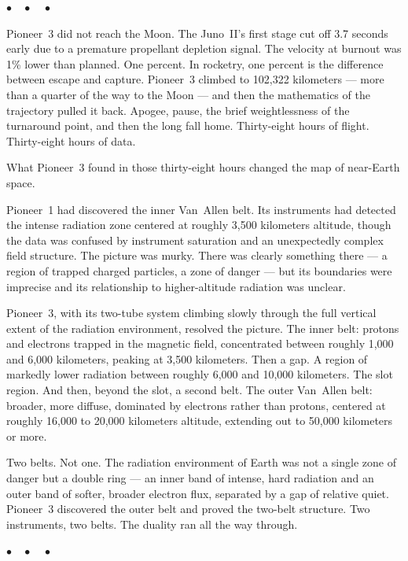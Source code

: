 \documentclass[12pt, letterpaper]{article}
\begin{document}
\begin{center}
$\bullet\quad\bullet\quad\bullet$
\end{center}

Pioneer~3 did not reach the Moon. The Juno~II's first stage cut off 3.7 seconds early due to a premature propellant depletion signal. The velocity at burnout was 1\% lower than planned. One percent. In rocketry, one percent is the difference between escape and capture. Pioneer~3 climbed to 102,322 kilometers --- more than a quarter of the way to the Moon --- and then the mathematics of the trajectory pulled it back. Apogee, pause, the brief weightlessness of the turnaround point, and then the long fall home. Thirty-eight hours of flight. Thirty-eight hours of data.

What Pioneer~3 found in those thirty-eight hours changed the map of near-Earth space.

Pioneer~1 had discovered the inner Van~Allen belt. Its instruments had detected the intense radiation zone centered at roughly 3,500 kilometers altitude, though the data was confused by instrument saturation and an unexpectedly complex field structure. The picture was murky. There was clearly something there --- a region of trapped charged particles, a zone of danger --- but its boundaries were imprecise and its relationship to higher-altitude radiation was unclear.

Pioneer~3, with its two-tube system climbing slowly through the full vertical extent of the radiation environment, resolved the picture. The inner belt: protons and electrons trapped in the magnetic field, concentrated between roughly 1,000 and 6,000 kilometers, peaking at 3,500 kilometers. Then a gap. A region of markedly lower radiation between roughly 6,000 and 10,000 kilometers. The slot region. And then, beyond the slot, a second belt. The outer Van~Allen belt: broader, more diffuse, dominated by electrons rather than protons, centered at roughly 16,000 to 20,000 kilometers altitude, extending out to 50,000 kilometers or more.

Two belts. Not one. The radiation environment of Earth was not a single zone of danger but a double ring --- an inner band of intense, hard radiation and an outer band of softer, broader electron flux, separated by a gap of relative quiet. Pioneer~3 discovered the outer belt and proved the two-belt structure. Two instruments, two belts. The duality ran all the way through.

\begin{center}
$\bullet\quad\bullet\quad\bullet$
\end{center}
\end{document}
